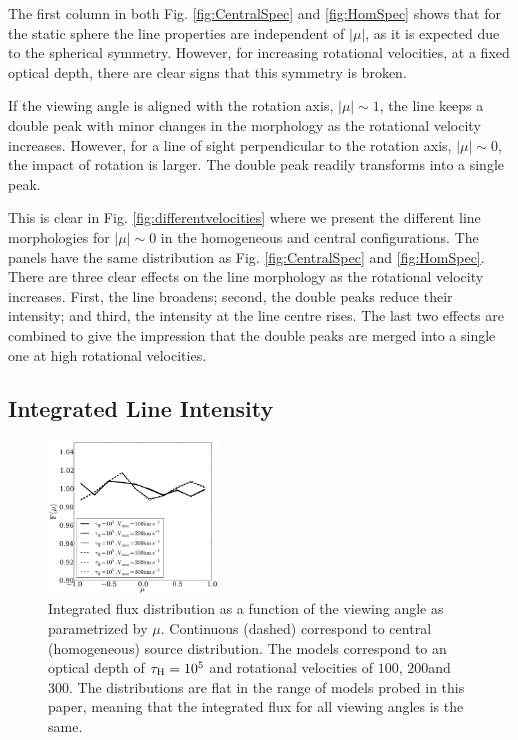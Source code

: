 \documentclass{emulateapj}
\newcommand{\ly}{{\ifmmode{{\rm Ly}\alpha~}\else{Ly$\alpha$~}\fi}}
\newcommand{\kms}{{\ifmmode{{\mathrm{\,km\ s}^{-1}}}\else{\,km~s$^{-1}$}\fi}}
\begin{document}
The first column in both Fig. \ref{fig:CentralSpec} and
\ref{fig:HomSpec} shows that for the static sphere the line properties
are independent of $|\mu|$, as it is expected due
to the spherical symmetry. 
However, for increasing rotational velocities, at a fixed optical
depth, there are clear signs that this symmetry is broken. 

If the viewing angle is aligned with the rotation axis, $|\mu|\sim
1$, the \ly line keeps a double peak with minor
changes in the morphology as the rotational velocity increases. 
However, for a line of sight perpendicular to the rotation axis,
$|\mu|\sim 0$, the impact of  rotation is larger.  
The double peak readily transforms into a single peak.

This is clear in  Fig. \ref{fig:differentvelocities} where we
present the different line morphologies for $|\mu|\sim 0$ in the
homogeneous and central configurations.  
The panels have the same distribution as Fig. \ref{fig:CentralSpec}
and \ref{fig:HomSpec}.    
There are three clear effects on the line morphology as the rotational
velocity increases.  
First, the line broadens; second, the double peaks reduce their intensity; and
third, the intensity at the line centre rises. 
The last two effects are combined to give the impression that the double
peaks are merged into a single one at high rotational velocities. 



\subsection{Integrated Line Intensity}
\label{sec:intlineint}

\begin{figure}
\begin{center}
  \includegraphics[width=0.4\textwidth]{f5.pdf}
\end{center}
\caption{Integrated flux distribution as a function of the
  viewing angle as parametrized by $\mu$. Continuous (dashed)
  correspond to central (homogeneous) source distribution.
  The models correspond to an optical depth of $\tau_{\rm
    H}=10^5$ and rotational velocities of $100$\kms, $200$\kms and
  $300$\kms. The distributions are flat in the range of models probed
  in this paper, meaning that the integrated flux for all viewing
  angles is the same.
\label{fig:muhisto}} 
\end{figure}
\end{document}
